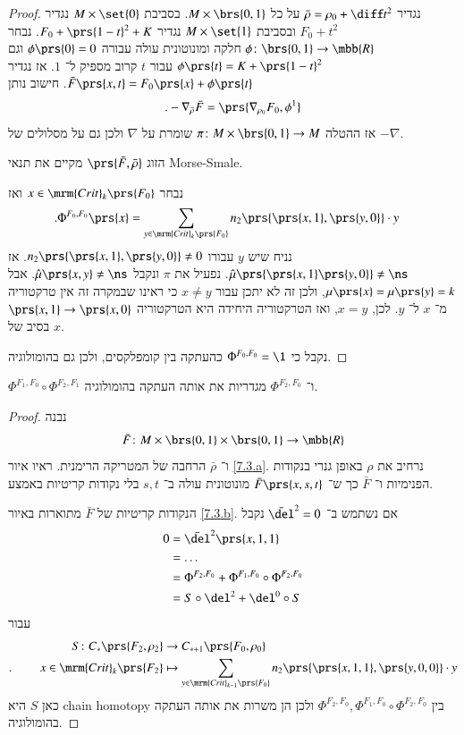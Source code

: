 \documentclass[a4paper,10pt,twoside,openany]{book}
\begin{document}
\begin{proof}
נגדיר
$\bar{\rho} = \rho_0 + \diff t^2$
על כל
$M \times \brs{0,1}$.
בסביבת
$M \times \set{0}$
נגדיר
$F_0 + t^2$
ובסביבת
$M \times \set{1}$
נגדיר
$F_0 + \prs{1-t}^2 + K$.
נבחר
$\phi \colon \brs{0,1} \to \mbb{R}$
חלקה ומונוטונית עולה עבורה
$\phi\prs{0} = 0$
וגם
$\phi\prs{t} = K + \prs{1-t}^2$
עבור
$t$
קרוב מספיק ל־%
$1$.
אז נגדיר
$\bar{F}\prs{x,t} = F_0\prs{x} + \phi\prs{t}$.
חישוב נותן
\[\text{.} - \nabla_{\bar{\rho}} \bar{F} = \prs{\nabla_{\rho_0} F_0, \phi^1}\]
אז ההטלה
$\pi \colon M \times \brs{0,1} \to M$
שומרת על
$\nabla$
ולכן גם על מסלולים של
$-\nabla$.

\begin{exercise}
הזוג
$\prs{\bar{F}, \bar{\rho}}$
מקיים את תנאי
\textenglish{Morse-Smale}.
\end{exercise}

נבחר
$x \in \mrm{Crit}_k\prs{F_0}$
ואז
\begin{align*}
\text{.} \Phi^{F_0, F_0}\prs{x} &= \sum_{y \in \mrm{Crit}_k\prs{F_0}} n_2\prs{\prs{x,1}, \prs{y,0}} \cdot y
\end{align*}
נניח שיש
$y$
עבורו
$n_2\prs{\prs{x,1}, \prs{y,0}} \neq 0$.
אז
$\hat{\mu}\prs{\prs{x,1}\prs{y,0}} \neq \ns$.
נפעיל את
$\pi$
ונקבל
$\hat{\mu}\prs{x,y} \neq \ns$.
אבל
$\mu\prs{x} = \mu\prs{y} = k$,
ולכן זה לא יתכן עבור
$x \neq y$
כי ראינו שבמקרה זה אין טרקטוריה מ־%
$x$
ל־%
$y$.
לכן,
$x = y$,
ואז הטרקטוריה היחידה היא הטרקטוריה
$\prs{x,1} \to \prs{x,0}$
בסיב של
$x$.

נקבל כי
$\Phi^{F_0, F_0} = \1$
כהעתקה בין קומפלקסים, ולכן גם בהומולוגיה.
\end{proof}

\begin{proposition}
$\Phi^{F_1, F_0} \circ \Phi^{F_2, F_1}$
ו־%
$\Phi^{F_2, F_0}$
מגדריות את אותה העתקה בהומולוגיה.
\end{proposition}

\begin{proof}
נבנה
\[\bar{F} \colon M \times \brs{0,1} \times \brs{0,1} \to \mbb{R}\]
ו־%
$\bar{\rho}$
הרחבה של המטריקה הרימנית.
ראיו איור
\ref{7.3.a}.
נרחיב את
$\rho$
באופן גנרי בנקודות הפנימיות ו־%
$\bar{F}$
כך ש־%
$\bar{F}\prs{x,s,t}$
מונוטונית עולה ב־%
$s,t$
בלי נקודות קריטיות באמצע.

הנקודות קריטיות של
$\bar{F}$
מתוארות באיור
\ref{7.3.b}.
אם נשתמש ב־%
$\bar{\del}^2 = 0$
נקבל
\begin{align*}
0 &= \bar{\del}^2\prs{x,1,1}
\\&= \ldots
\\&= \Phi^{F_2, F_0} + \Phi^{F_1, F_0} \circ \Phi^{F_2, F_0} 
\\&= S \circ \del^2 + \del^0 \circ S
\end{align*}
עבור
\begin{align*}
S \colon C_*\prs{F_2, \rho_2} &\to C_{*+1}\prs{F_0, \rho_0} \\
\text{.} \hphantom{lalala} x \in \mrm{Crit}_k\prs{F_2} &\mapsto \sum_{y \in \mrm{Crit}_{k-1}\prs{F_0}} n_2 \prs{\prs{x,1,1}, \prs{y,0,0}} \cdot y
\end{align*}
כאן
$S$
היא
\textenglish{chain homotopy}
בין
$\Phi^{F_2, F_0}, \Phi^{F_1, F_0} \circ \Phi^{F_2, F_0}$
ולכן הן משרות את אותה העתקה בהומולוגיה.
\end{proof}
\end{document}
